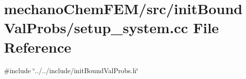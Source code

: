 \section{mechano\+Chem\+F\+E\+M/src/init\+Bound\+Val\+Probs/setup\+\_\+system.cc File Reference}
\label{setup__system_8cc}
{\ttfamily \#include \char`\"{}../../include/init\+Bound\+Val\+Probs.\+h\char`\"{}}\newline
